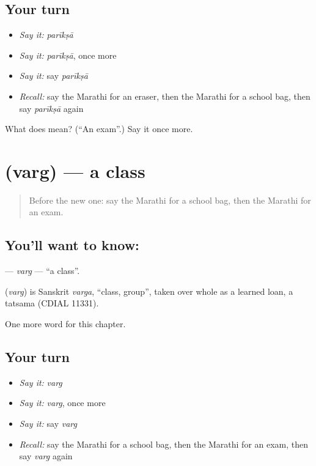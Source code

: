 \subsection*{Your turn}
\begin{itemize}
\raggedright
  \item \emph{Say it:} \emph{parīkṣā}
  \item \emph{Say it:} \emph{parīkṣā}, once more
  \item \emph{Say it:} say \emph{parīkṣā}
  \item \emph{Recall:} say the Marathi for an eraser, then the Marathi for a school bag, then say \emph{parīkṣā} again
\end{itemize}

\begin{tcolorbox}[breakable,colback=teal!4,colframe=teal!35!black,title={Before you move on}]
What does  mean? (\textquotedblleft{}An exam\textquotedblright{}.) Say it once more.
\end{tcolorbox}
\section[\texorpdfstring{\mr{वर्ग} (varg)}{वर्ग (varg)}]{ (varg) — a class}

\label{lesson:MR-C135-varg}



\begin{quote}
Before the new one: say the Marathi for a school bag, then the Marathi for an exam.
\end{quote}

\subsection*{You'll want to know: }
\textbf{} — \emph{varg} — \textquotedblleft{}a class\textquotedblright{}.

\begin{cousinweb}
\textbf{} (\emph{varg}) is Sanskrit \emph{varga}, \textquotedblleft{}class, group\textquotedblright{}, taken over whole as a learned loan, a tatsama (CDIAL 11331).
\end{cousinweb}

\begin{grammarlens}[title={What you've built}]
One more word for this chapter.
\end{grammarlens}

\subsection*{Your turn}
\begin{itemize}
\raggedright
  \item \emph{Say it:} \emph{varg}
  \item \emph{Say it:} \emph{varg}, once more
  \item \emph{Say it:} say \emph{varg}
  \item \emph{Recall:} say the Marathi for a school bag, then the Marathi for an exam, then say \emph{varg} again
\end{itemize}

